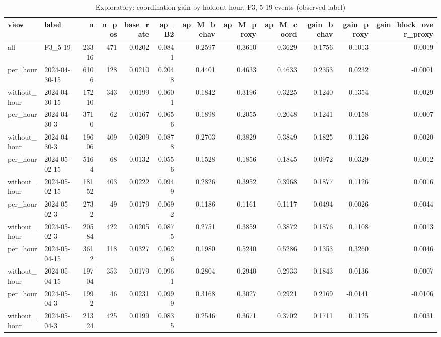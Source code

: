 \begin{table}
\caption{Exploratory: coordination gain by holdout hour, F3, 5-19 events (observed label)}
\label{tab:tab_exploratory_coordination_final}
\begin{tabular}{llrrrrrrrrrr}
\toprule
view & label & n & n\_pos & base\_rate & ap\_B2 & ap\_M\_behav & ap\_M\_proxy & ap\_M\_coord & gain\_behav & gain\_proxy & gain\_block\_over\_proxy \\
\midrule
all & F3\_5-19 & 23316 & 471 & 0.0202 & 0.0841 & 0.2597 & 0.3610 & 0.3629 & 0.1756 & 0.1013 & 0.0019 \\
per\_hour & 2024-04-30-15 & 6106 & 128 & 0.0210 & 0.2048 & 0.4401 & 0.4633 & 0.4633 & 0.2353 & 0.0232 & -0.0001 \\
without\_hour & 2024-04-30-15 & 17210 & 343 & 0.0199 & 0.0601 & 0.1842 & 0.3196 & 0.3225 & 0.1240 & 0.1354 & 0.0029 \\
per\_hour & 2024-04-30-3 & 3710 & 62 & 0.0167 & 0.0656 & 0.1898 & 0.2055 & 0.2048 & 0.1241 & 0.0158 & -0.0007 \\
without\_hour & 2024-04-30-3 & 19606 & 409 & 0.0209 & 0.0878 & 0.2703 & 0.3829 & 0.3849 & 0.1825 & 0.1126 & 0.0020 \\
per\_hour & 2024-05-02-15 & 5164 & 68 & 0.0132 & 0.0556 & 0.1528 & 0.1856 & 0.1845 & 0.0972 & 0.0329 & -0.0012 \\
without\_hour & 2024-05-02-15 & 18152 & 403 & 0.0222 & 0.0949 & 0.2826 & 0.3952 & 0.3968 & 0.1877 & 0.1126 & 0.0016 \\
per\_hour & 2024-05-02-3 & 2732 & 49 & 0.0179 & 0.0692 & 0.1186 & 0.1161 & 0.1117 & 0.0494 & -0.0026 & -0.0044 \\
without\_hour & 2024-05-02-3 & 20584 & 422 & 0.0205 & 0.0875 & 0.2751 & 0.3859 & 0.3872 & 0.1876 & 0.1108 & 0.0013 \\
per\_hour & 2024-05-04-15 & 3612 & 118 & 0.0327 & 0.0626 & 0.1980 & 0.5240 & 0.5286 & 0.1353 & 0.3260 & 0.0046 \\
without\_hour & 2024-05-04-15 & 19704 & 353 & 0.0179 & 0.0961 & 0.2804 & 0.2940 & 0.2933 & 0.1843 & 0.0136 & -0.0007 \\
per\_hour & 2024-05-04-3 & 1992 & 46 & 0.0231 & 0.0999 & 0.3168 & 0.3027 & 0.2921 & 0.2169 & -0.0141 & -0.0106 \\
without\_hour & 2024-05-04-3 & 21324 & 425 & 0.0199 & 0.0835 & 0.2546 & 0.3671 & 0.3702 & 0.1711 & 0.1125 & 0.0031 \\
\bottomrule
\end{tabular}
\end{table}
